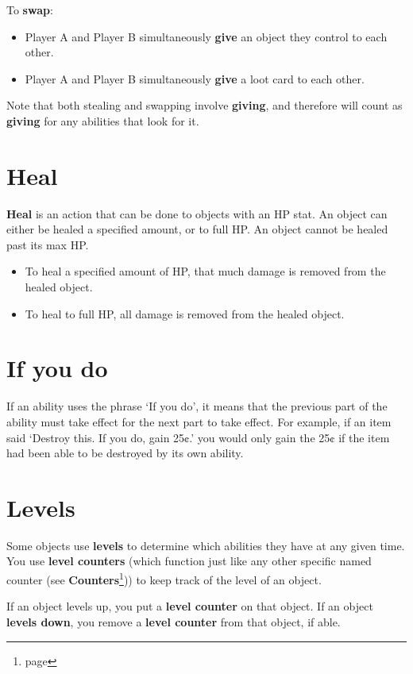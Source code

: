 \documentclass[a4paper, twoside]{report} %
\begin{document}
    To \textbf{swap}:
    \begin{itemize}
        \item Player A and Player B simultaneously \textbf{give} an object they control to each other.
        \item Player A and Player B simultaneously \textbf{give} a loot card to each other.
    \end{itemize}
    
    Note that both stealing and swapping involve \textbf{giving}, and therefore will count as \textbf{giving} for any abilities that look for it.
    \section{Heal}
    \textbf{Heal} is an action that can be done to objects with an HP stat. An object can either be healed a specified amount, or to full HP. An object cannot be healed past its max HP.

    \begin{itemize}
        \item To heal a specified amount of HP, that much damage is removed from the healed object. 
        \item To heal to full HP, all damage is removed from the healed object.
    \end{itemize}
    \section{If you do}
    If an ability uses the phrase ‘If you do’, it means that the previous part of the ability must take effect for the next part to take effect. For example, if an item said ‘Destroy this. If you do, gain 25¢.’ you would only gain the 25¢ if the item had been able to be destroyed by its own ability.
    \section{Levels}
    Some objects use \textbf{levels} to determine which abilities they have at any given time. You use \textbf{level counters} (which function just like any other specific named counter (see \textbf{Counters}\footnote{page \pageref{counters}})) to keep track of the level of an object.

    If an object levels up, you put a \textbf{level counter} on that object. If an object \textbf{levels down}, you remove a \textbf{level counter} from that object, if able.
\end{document}
